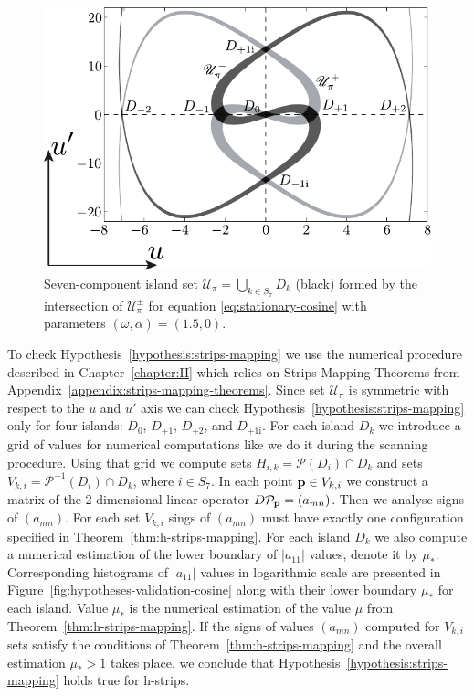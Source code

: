 \begin{figure}[h]
\centering
	\includegraphics[scale = 1]{pic/island set to check hypotheses for cosine equation}
	\caption{
		Seven-component island set $\mathscr{U}_{\pi} = \bigcup_{k \in S_7} D_k$ (black) formed by the intersection of $\mathscr{U}_{\pi}^{\pm}$ for equation \eqref{eq:stationary-cosine} with parameters $(\omega, \alpha) = (1.5, 0)$.
	}
\label{fig:island-set-cosine}
\end{figure}

To check Hypothesis~\ref{hypothesis:strips-mapping} we use the numerical procedure described in Chapter~\ref{chapter:II} which relies on Strips Mapping Theorems from Appendix~\ref{appendix:strips-mapping-theorems}.
Since set $\mathscr{U}_{\pi}$ is symmetric with respect to the $u$ and $u'$ axis we can check Hypothesis~\ref{hypothesis:strips-mapping} only for four islands: $D_0$, $D_{+1}$, $D_{+2}$, and $D_{+1\mathrm{i}}$.
For each island $D_k$ we introduce a grid of values for numerical computations like we do it during the scanning procedure.
Using that grid we compute sets $H_{i, k} = \mathcal{P}(D_i) \cap D_k$ and sets $V_{k, i} = \mathcal{P}^{-1}(D_i) \cap D_k$, where $i \in S_7$.
In each point $\vb{p} \in V_{k, i}$ we construct a matrix of the 2-dimensional linear operator $D \mathcal{P}_{\vb{p}} = (a_{mn})$.
Then we analyse signs of $(a_{mn})$.
For each set $V_{k, i}$ sings of $(a_{mn})$ must have exactly one configuration specified in Theorem~\ref{thm:h-strips-mapping}.
For each island $D_k$ we also compute a numerical estimation of the lower boundary of $|a_{11}|$ values, denote it by $\mu_*$.
Corresponding histograms of $|a_{11}|$ values in logarithmic scale are presented in Figure~\ref{fig:hypotheses-validation-cosine} along with their lower boundary $\mu_*$ for each island.
Value $\mu_*$ is the numerical estimation of the value $\mu$ from Theorem~\ref{thm:h-strips-mapping}.
If the signs of values $(a_{mn})$ computed for $V_{k, i}$ sets satisfy the conditions of Theorem~\ref{thm:h-strips-mapping} and the overall estimation $\mu_* > 1$ takes place, we conclude that Hypothesis~\ref{hypothesis:strips-mapping} holds true for h-strips.

